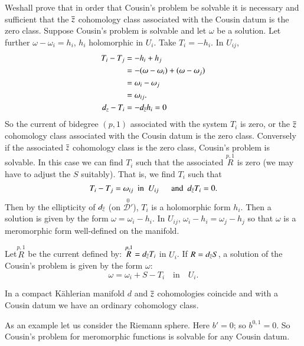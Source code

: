 We\pageoriginale shall prove that in order that Cousin's problem be
solvable it is necessary and sufficient that the $\overline{z}$ cohomology
class associated with the Cousin datum is the zero class. Suppose
Cousin's problem is solvable and let $\omega$ be a solution. Let
further $\omega-\omega_{i}=h_{i}$, $h_{i}$ holomorphic in
$U_{i}$. Take $T_{i}=-h_{i}$. In $U_{ij}$,
\begin{align*}
T_{i}-T_{j} &= -h_{i}+h_{j}\\
           &= -(\omega-\omega_{i})+(\omega-\omega_{j})\\
           &= \omega_{i}-\omega_{j}\\
           &= \omega_{ij}.\\
d_{z}-T_{i} &= -d_{\overline{z}}h_{i}=0 
\end{align*}
So the current of bidegree $(p,1)$ associated with the system $T_{i}$
is zero, or the $\overline{z}$ cohomology class associated with the Cousin
datum is the zero class. Conversely if the associated $\overline{z}$
cohomology class is the zero class, Cousin's problem is solvable. In
this case we can find $T_{i}$ such that the associated
$\overset{p,1}{R}$ is zero (we may have to adjust the $S$
suitably). That is, we find $T_{i}$ such that
$$
T_{i}-T_{j}=\omega_{ij}\text{ \  in \ } U_{ij}\quad\text{ \  and \ }
d_{\overline{z}}T_{i}=0.
$$
Then by the ellipticity of $d_{\overline{z}}$ (on
$\overset{0}{\mathscr{D}'}$), $T_{i}$ is a holomorphic form
$h_{i}$. Then a solution is given by the form
$\omega=\omega_{i}-h_{i}$. In $U_{ij}$,
$\omega_{i}-h_{i}=\omega_{j}-h_{j}$ so that $\omega$ is a meromorphic
form well-defined on the manifold.

Let\pageoriginale $\overset{p,1}{R}$ be the current defined by:
$\overset{p,1}{R}=d_{\overline{z}}T_{i}$ in $U_{i}$. If $R=d_{\overline{z}}S$, a
solution of the Cousin's problem is given by the form $\omega$:
$$
\omega=\omega_{i}+S-T_{i}\quad\text{in}\quad U_{i}.
$$

In a compact K\"ahlerian manifold $d$ and $\overline{z}$ cohomologies
coincide and with a Cousin datum we have an ordinary cohomology class.

As an example let us consider the Riemann sphere. Here $b'=0$; so
$b^{0,1}=0$. So Cousin's problem for meromorphic functions is solvable
for any Cousin datum.


